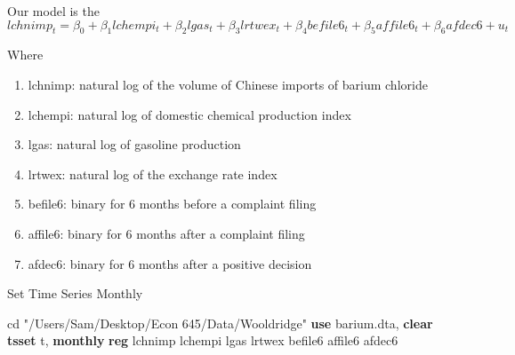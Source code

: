 \documentclass[
]{book}
\newenvironment{Shaded}{\begin{snugshade}}{\end{snugshade}}
\newcommand{\FunctionTok}[1]{\textcolor[rgb]{0.13,0.29,0.53}{\textbf{#1}}}
\newcommand{\KeywordTok}[1]{\textcolor[rgb]{0.13,0.29,0.53}{\textbf{#1}}}
\newcommand{\NormalTok}[1]{#1}
\newcommand{\StringTok}[1]{\textcolor[rgb]{0.31,0.60,0.02}{#1}}
\providecommand{\tightlist}{%
  \setlength{\itemsep}{0pt}\setlength{\parskip}{0pt}}
\begin{document}
Our model is the
\[ lchnimp_t = \beta_0 + \beta_1 lchempi_t + \beta_2 lgas_t + \beta_3 lrtwex_t +\beta_4 befile6_t + \beta_5 affile6_t + \beta_6 afdec6 + u_t \]

Where

\begin{enumerate}
\def\labelenumi{\arabic{enumi}.}
\tightlist
\item
  lchnimp: natural log of the volume of Chinese imports of barium chloride
\item
  lchempi: natural log of domestic chemical production index
\item
  lgas: natural log of gasoline production
\item
  lrtwex: natural log of the exchange rate index
\item
  befile6: binary for 6 months before a complaint filing
\item
  affile6: binary for 6 months after a complaint filing
\item
  afdec6: binary for 6 months after a positive decision
\end{enumerate}

Set Time Series Monthly

\begin{Shaded}
\begin{Highlighting}[]
\NormalTok{cd }\StringTok{"/Users/Sam/Desktop/Econ 645/Data/Wooldridge"}
\KeywordTok{use}\NormalTok{ barium.dta, }\KeywordTok{clear}
\KeywordTok{tsset}\NormalTok{ t, }\FunctionTok{monthly}
\KeywordTok{reg}\NormalTok{ lchnimp lchempi lgas lrtwex befile6 affile6 afdec6}
\end{Highlighting}
\end{Shaded}
\end{document}
